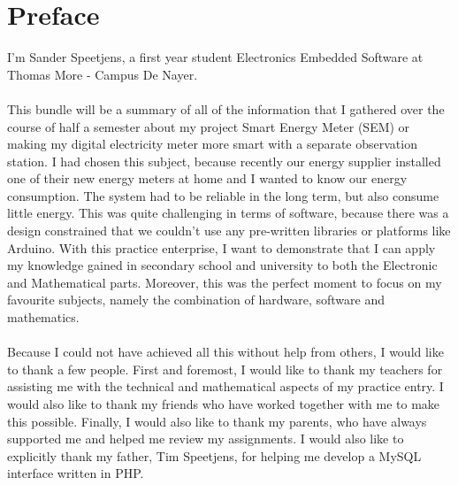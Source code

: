 \documentclass[a4paper,twoside, 12pt]{report}
\theoremstyle{break}
\begin{document}
\chapter*{Preface}
\thispagestyle{empty}
I'm Sander Speetjens, a first year student Electronics Embedded Software at Thomas More - Campus De Nayer.
\ \\ \ \\
This bundle will be a summary of all of the information that I gathered over the course of half a semester about my project Smart Energy Meter (SEM) or making my digital electricity meter more smart with a separate observation station. I had chosen this subject, because recently our energy supplier installed one of their new energy meters at home and I wanted to know our energy consumption. The system had to be reliable in the long term, but also consume little energy. This was quite challenging in terms of software, because there was a design constrained that we couldn't use any pre-written libraries or platforms like Arduino. With this practice enterprise, I want to demonstrate that I can apply my knowledge gained in secondary school and university to both the Electronic and Mathematical parts. Moreover, this was the perfect moment to focus on my favourite subjects, namely the combination of hardware, software and mathematics.
\ \\ \ \\
Because I could not have achieved all this without help from others, I would like to thank a few people. First and foremost, I would like to thank my teachers for assisting me with the technical and mathematical aspects of my practice entry.  I would also like to thank my friends who have worked together with me to make this possible. 
Finally, I would also like to thank my parents, who have always supported me and helped me review my assignments.  I would also like to explicitly thank my father, Tim Speetjens, for helping me develop a MySQL interface written in PHP.
\vfill
\eject


\clearpage{\pagestyle{empty}\cleardoublepage}


\setcounter{section}{0}
\setcounter{subsection}{0}

\tableofcontents
\thispagestyle{empty}

\vfill

\eject

\vfill
\end{document}

